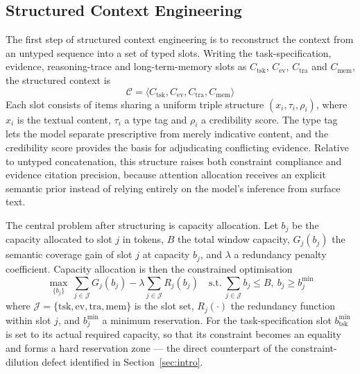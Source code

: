 \documentclass[journal,10pt,a4paper]{IEEEtran}
\begin{document}
\subsection{Structured Context Engineering}
The first step of structured context engineering is to reconstruct the context from an untyped sequence into a set of typed slots. Writing the task-specification, evidence, reasoning-trace and long-term-memory slots as $C_{\mathrm{tsk}}$, $C_{\mathrm{ev}}$, $C_{\mathrm{tra}}$ and $C_{\mathrm{mem}}$, the structured context is
\begin{equation}
\mathcal{C}=\langle C_{\mathrm{tsk}},C_{\mathrm{ev}},C_{\mathrm{tra}},C_{\mathrm{mem}}\rangle
\end{equation}
Each slot consists of items sharing a uniform triple structure $(x_i,\tau_i,\rho_i)$, where $x_i$ is the textual content, $\tau_i$ a type tag and $\rho_i$ a credibility score. The type tag lets the model separate prescriptive from merely indicative content, and the credibility score provides the basis for adjudicating conflicting evidence. Relative to untyped concatenation, this structure raises both constraint compliance and evidence citation precision, because attention allocation receives an explicit semantic prior instead of relying entirely on the model's inference from surface text.

The central problem after structuring is capacity allocation. Let $b_j$ be the capacity allocated to slot $j$ in tokens, $B$ the total window capacity, $G_j(b_j)$ the semantic coverage gain of slot $j$ at capacity $b_j$, and $\lambda$ a redundancy penalty coefficient. Capacity allocation is then the constrained optimisation
\begin{equation}
\max_{\{b_j\}}\ \sum_{j\in\mathcal{J}}G_j(b_j)-\lambda\sum_{j\in\mathcal{J}}R_j(b_j)\quad \text{s.t.}\ \sum_{j\in\mathcal{J}}b_j\le B,\ b_j\ge b_j^{\min}
\end{equation}
where $\mathcal{J}=\{\mathrm{tsk},\mathrm{ev},\mathrm{tra},\mathrm{mem}\}$ is the slot set, $R_j(\cdot)$ the redundancy function within slot $j$, and $b_j^{\min}$ a minimum reservation. For the task-specification slot $b_{\mathrm{tsk}}^{\min}$ is set to its actual required capacity, so that its constraint becomes an equality and forms a hard reservation zone --- the direct counterpart of the constraint-dilution defect identified in Section~\ref{sec:intro}.
\end{document}
